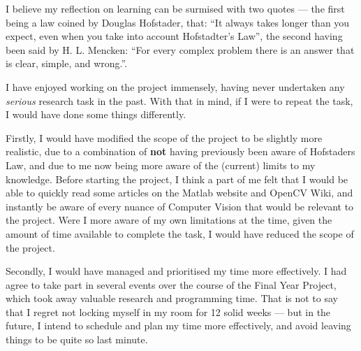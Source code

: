 I believe my reflection on learning can be surmised with two quotes --- the first being a law coined by Douglas Hofstader, that: ``It always takes longer than you expect, even when you take into account Hofstadter's Law'', the second having been said by H. L. Mencken: ``For every complex problem there is an answer that is clear, simple, and wrong.''.

I have enjoyed working on the project immensely, having never undertaken any \textit{serious} research task in the past. With that in mind, if I were to repeat the task, I would have done some things differently.

Firstly, I would have modified the scope of the project to be slightly more realistic, due to a combination of \textbf{not} having previously been aware of Hofstaders Law, and due to me now being more aware of the (current) limits to my knowledge. Before starting the project, I think a part of me felt that I would be able to quickly read some articles on the Matlab website and OpenCV Wiki, and instantly be aware of every nuance of Computer Vision that would be relevant to the project. Were I more aware of my own limitations at the time, given the amount of time available to complete the task, I would have reduced the scope of the project.

Secondly, I would have managed and prioritised my time more effectively. I had agree to take part in several events over the course of the Final Year Project, which took away valuable research and programming time. That is not to say that I regret not locking myself in my room for 12 solid weeks --- but in the future, I intend to schedule and plan my time more effectively, and avoid leaving things to be quite so last minute.
